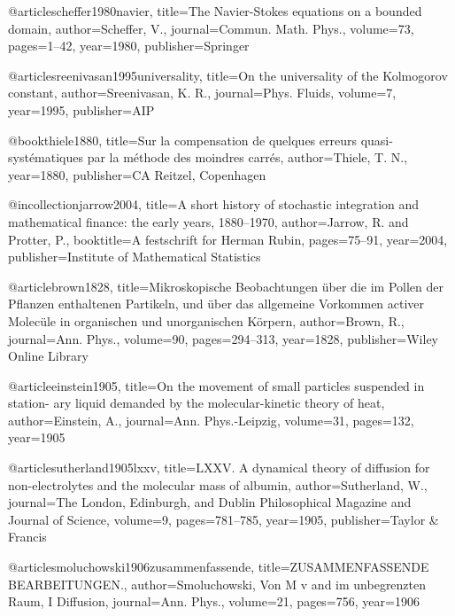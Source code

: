   @article{scheffer1980navier,
    title={{The Navier-Stokes equations on a bounded domain}},
    author={Scheffer, V.},
    journal={Commun. Math. Phys.},
    volume={73},
    pages={1--42},
    year={1980},
    publisher={Springer}
  }


  @article{sreenivasan1995universality,
    title={{On the universality of the Kolmogorov constant}},
    author={Sreenivasan, K. R.},
    journal={Phys. Fluids},
    volume={7},
    year={1995},
    publisher={AIP}
  }


@book{thiele1880,
  title={{Sur la compensation de quelques erreurs quasi-syst{\'e}matiques par la m{\'e}thode des moindres carr{\'e}s}},
  author={Thiele, T. N.},
  year={1880},
  publisher={CA Reitzel, Copenhagen}
}

@incollection{jarrow2004,
  title={{A short history of stochastic integration and mathematical finance: the early years, 1880--1970}},
  author={Jarrow, R. and Protter, P.},
  booktitle={A festschrift for Herman Rubin},
  pages={75--91},
  year={2004},
  publisher={Institute of Mathematical Statistics}
}

@article{brown1828,
  title={{Mikroskopische Beobachtungen {\"u}ber die im Pollen der Pflanzen enthaltenen Partikeln, und {\"u}ber das allgemeine Vorkommen activer Molec{\"u}le in organischen und unorganischen K{\"o}rpern}},
  author={Brown, R.},
  journal={Ann. Phys.},
  volume={90},
  pages={294--313},
  year={1828},
  publisher={Wiley Online Library}
}

@article{einstein1905,
  title={{On the movement of small particles suspended in station-
ary liquid demanded by the molecular-kinetic theory of heat}},
  author={Einstein, A.},
  journal={Ann. Phys.-Leipzig},
  volume={31},
  pages={132},
  year={1905}
}

@article{sutherland1905lxxv,
  title={{LXXV. A dynamical theory of diffusion for non-electrolytes and the molecular mass of albumin}},
  author={Sutherland, W.},
  journal={The London, Edinburgh, and Dublin Philosophical Magazine and Journal of Science},
  volume={9},
  pages={781--785},
  year={1905},
  publisher={Taylor \& Francis}
}

@article{smoluchowski1906zusammenfassende,
  title={{ZUSAMMENFASSENDE BEARBEITUNGEN.}},
  author={Smoluchowski, Von M v and im unbegrenzten Raum, I Diffusion},
  journal={Ann. Phys.},
  volume={21},
  pages={756},
  year={1906}
}

